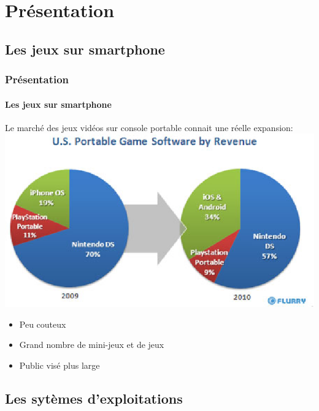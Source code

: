 \section{Présentation}

\subsection{Les jeux sur smartphone}

\begin{frame}
\frametitle{Présentation}
\framesubtitle{Les jeux sur smartphone}
Le marché des jeux vidéos sur console portable connait une réelle expansion: \\ \includegraphics[scale=0.4]{img/marche_console_portable.png} 

\begin{itemize} 
		\item{Peu couteux}
		\item{Grand nombre de mini-jeux et de jeux}
		\item{Public visé plus large}
\end{itemize}
\end{frame}


\subsection{Les sytèmes d'exploitations}


